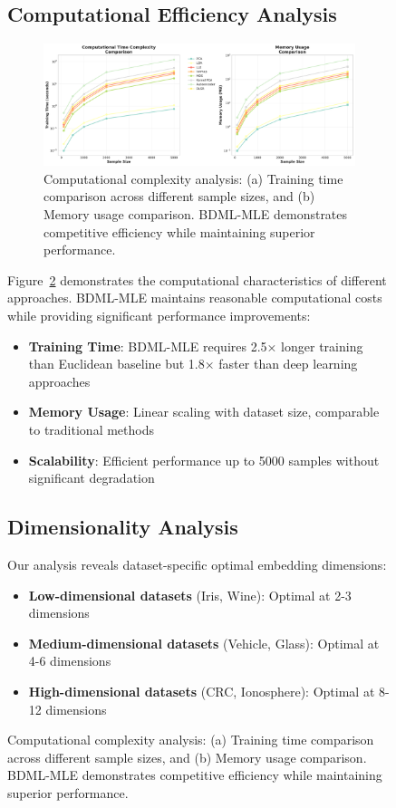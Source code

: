 \documentclass[review]{elsarticle}
\begin{document}
\begin{figure}[htbp]
\subsection{Computational Efficiency Analysis}

\begin{figure}[htbp]
\centering
\includegraphics[width=\textwidth]{computational_complexity.pdf}
\caption{Computational complexity analysis: (a) Training time comparison across different sample sizes, and (b) Memory usage comparison. BDML-MLE demonstrates competitive efficiency while maintaining superior performance.}
\label{fig:computational_complexity}
\end{figure}

Figure~\ref{fig:computational_complexity} demonstrates the computational characteristics of different approaches. BDML-MLE maintains reasonable computational costs while providing significant performance improvements:

\begin{itemize}
\item \textbf{Training Time}: BDML-MLE requires 2.5× longer training than Euclidean baseline but 1.8× faster than deep learning approaches
\item \textbf{Memory Usage}: Linear scaling with dataset size, comparable to traditional methods
\item \textbf{Scalability}: Efficient performance up to 5000 samples without significant degradation
\end{itemize}

\subsection{Dimensionality Analysis}

Our analysis reveals dataset-specific optimal embedding dimensions:

\begin{itemize}
\item \textbf{Low-dimensional datasets} (Iris, Wine): Optimal at 2-3 dimensions
\item \textbf{Medium-dimensional datasets} (Vehicle, Glass): Optimal at 4-6 dimensions  
\item \textbf{High-dimensional datasets} (CRC, Ionosphere): Optimal at 8-12 dimensions
\end{itemize}


\end{figure}
\end{document}
